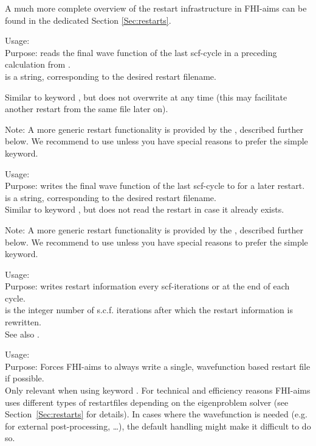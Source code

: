A much more complete overview of the restart infrastructure in FHI-aims
can be found in the dedicated Section \ref{Sec:restarts}.

{
  \noindent
  Usage:   \\[1.0ex]
  Purpose: reads the final wave function of the last scf-cycle in a
    preceding calculation from .\\[1.0ex]
   is a string, corresponding to the desired restart
  filename. \\
}

Similar to keyword , but does not overwrite
 at any time (this may facilitate another restart from
the same file later on).

Note: A more generic restart functionality is provided by the
, described further below. We recommend to use
 unless you have special reasons to prefer the
simple  keyword. 

{
  \noindent
  Usage:   \\[1.0ex]
  Purpose: writes the final wave function of the last scf-cycle to
   for a later restart. \\[1.0ex]
   is a string, corresponding to the desired restart
  filename. \\
}
Similar to keyword , but does not read the restart
   in case it already exists.

Note: A more generic restart functionality is provided by the
, described further below. We recommend to use
 unless you have special reasons to prefer the
simple  keyword. 

{
  \noindent
  Usage:   \\[1.0ex]
  Purpose: writes restart information every 
    scf-iterations or at the end of each cycle. \\[1.0ex]
   is the integer number of s.c.f. iterations after
  which the restart information is rewritten. \\
}
See also .

{
  \noindent
  Usage:   \\[1.0ex]
  Purpose: Forces FHI-aims to always write a single, wavefunction based restart
  file if possible.\\[1.0ex]
}
Only relevant when using keyword .
For technical and efficiency reasons FHI-aims uses different types of
restartfiles depending on the eigenproblem solver (see
Section~\ref{Sec:restarts} for details). In cases where the wavefunction is
needed (e.g. for external post-processing, \ldots), the default 
handling might make it difficult to do so.

